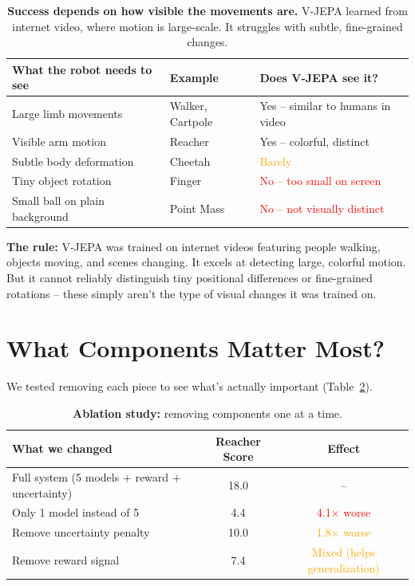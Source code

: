 \documentclass{article}
\begin{document}
\begin{table}[h]
\centering
\caption{\textbf{Success depends on how visible the movements are.} V-JEPA learned from internet video, where motion is large-scale. It struggles with subtle, fine-grained changes.}
\label{tab:why}
\begin{tabular}{lll}
\toprule
\textbf{What the robot needs to see} & \textbf{Example} & \textbf{Does V-JEPA see it?} \\
\midrule
Large limb movements & Walker, Cartpole & \textcolor{green!60!black}{Yes -- similar to humans in video} \\
Visible arm motion & Reacher & \textcolor{green!60!black}{Yes -- colorful, distinct} \\
Subtle body deformation & Cheetah & \textcolor{orange}{Barely} \\
Tiny object rotation & Finger & \textcolor{red}{No -- too small on screen} \\
Small ball on plain background & Point Mass & \textcolor{red}{No -- not visually distinct} \\
\bottomrule
\end{tabular}
\end{table}

\textbf{The rule:} V-JEPA was trained on internet videos featuring people walking, objects moving, and scenes changing. It excels at detecting large, colorful motion. But it cannot reliably distinguish tiny positional differences or fine-grained rotations -- these simply aren't the type of visual changes it was trained on.

\section{What Components Matter Most?}

We tested removing each piece to see what's actually important (Table~\ref{tab:ablation}).

\begin{table}[h]
\centering
\caption{\textbf{Ablation study:} removing components one at a time.}
\label{tab:ablation}
\begin{tabular}{lcc}
\toprule
\textbf{What we changed} & \textbf{Reacher Score} & \textbf{Effect} \\
\midrule
Full system (5 models + reward + uncertainty) & 18.0 & -- \\
Only 1 model instead of 5 & 4.4 & \textcolor{red}{4.1$\times$ worse} \\
Remove uncertainty penalty & 10.0 & \textcolor{orange}{1.8$\times$ worse} \\
Remove reward signal & 7.4 & \textcolor{orange}{Mixed (helps generalization)} \\
\bottomrule
\end{tabular}
\end{table}
\end{document}
